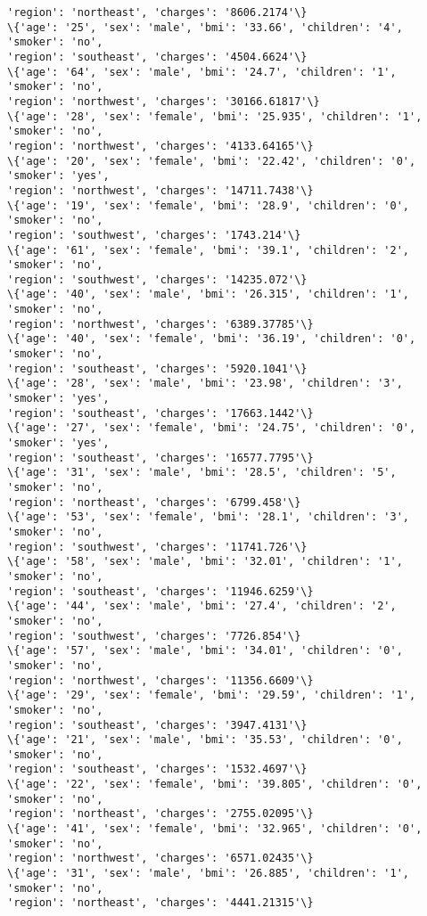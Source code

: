 \documentclass[11pt]{article}
\begin{document}
\begin{Verbatim}[commandchars=\\\{\}]
'region': 'northeast', 'charges': '8606.2174'\}
\{'age': '25', 'sex': 'male', 'bmi': '33.66', 'children': '4', 'smoker': 'no',
'region': 'southeast', 'charges': '4504.6624'\}
\{'age': '64', 'sex': 'male', 'bmi': '24.7', 'children': '1', 'smoker': 'no',
'region': 'northwest', 'charges': '30166.61817'\}
\{'age': '28', 'sex': 'female', 'bmi': '25.935', 'children': '1', 'smoker': 'no',
'region': 'northwest', 'charges': '4133.64165'\}
\{'age': '20', 'sex': 'female', 'bmi': '22.42', 'children': '0', 'smoker': 'yes',
'region': 'northwest', 'charges': '14711.7438'\}
\{'age': '19', 'sex': 'female', 'bmi': '28.9', 'children': '0', 'smoker': 'no',
'region': 'southwest', 'charges': '1743.214'\}
\{'age': '61', 'sex': 'female', 'bmi': '39.1', 'children': '2', 'smoker': 'no',
'region': 'southwest', 'charges': '14235.072'\}
\{'age': '40', 'sex': 'male', 'bmi': '26.315', 'children': '1', 'smoker': 'no',
'region': 'northwest', 'charges': '6389.37785'\}
\{'age': '40', 'sex': 'female', 'bmi': '36.19', 'children': '0', 'smoker': 'no',
'region': 'southeast', 'charges': '5920.1041'\}
\{'age': '28', 'sex': 'male', 'bmi': '23.98', 'children': '3', 'smoker': 'yes',
'region': 'southeast', 'charges': '17663.1442'\}
\{'age': '27', 'sex': 'female', 'bmi': '24.75', 'children': '0', 'smoker': 'yes',
'region': 'southeast', 'charges': '16577.7795'\}
\{'age': '31', 'sex': 'male', 'bmi': '28.5', 'children': '5', 'smoker': 'no',
'region': 'northeast', 'charges': '6799.458'\}
\{'age': '53', 'sex': 'female', 'bmi': '28.1', 'children': '3', 'smoker': 'no',
'region': 'southwest', 'charges': '11741.726'\}
\{'age': '58', 'sex': 'male', 'bmi': '32.01', 'children': '1', 'smoker': 'no',
'region': 'southeast', 'charges': '11946.6259'\}
\{'age': '44', 'sex': 'male', 'bmi': '27.4', 'children': '2', 'smoker': 'no',
'region': 'southwest', 'charges': '7726.854'\}
\{'age': '57', 'sex': 'male', 'bmi': '34.01', 'children': '0', 'smoker': 'no',
'region': 'northwest', 'charges': '11356.6609'\}
\{'age': '29', 'sex': 'female', 'bmi': '29.59', 'children': '1', 'smoker': 'no',
'region': 'southeast', 'charges': '3947.4131'\}
\{'age': '21', 'sex': 'male', 'bmi': '35.53', 'children': '0', 'smoker': 'no',
'region': 'southeast', 'charges': '1532.4697'\}
\{'age': '22', 'sex': 'female', 'bmi': '39.805', 'children': '0', 'smoker': 'no',
'region': 'northeast', 'charges': '2755.02095'\}
\{'age': '41', 'sex': 'female', 'bmi': '32.965', 'children': '0', 'smoker': 'no',
'region': 'northwest', 'charges': '6571.02435'\}
\{'age': '31', 'sex': 'male', 'bmi': '26.885', 'children': '1', 'smoker': 'no',
'region': 'northeast', 'charges': '4441.21315'\}

\end{Verbatim}
\end{document}
